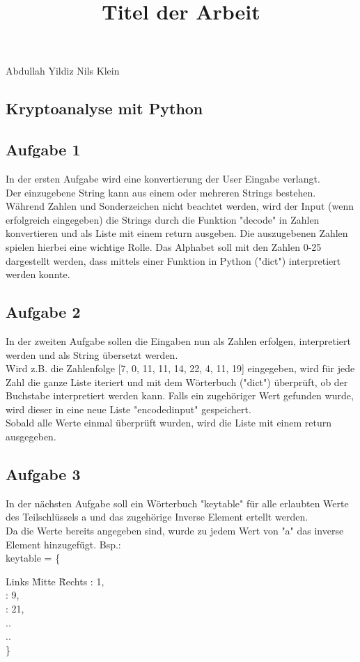 \documentclass[12pt]{article}
\title{\textbf{Titel der Arbeit}}
\begin{document}
\newpage
Abdullah Yildiz
Nils Klein


\begin{spacing}{}
\setcounter{page}{2}
\tableofcontents
\end{spacing}

\newpage
\begin{spacing}{}
\section{Kryptoanalyse mit Python}
\subsection{Aufgabe 1}
In der ersten Aufgabe wird eine konvertierung der User Eingabe verlangt.\\
Der einzugebene String kann aus einem oder mehreren Strings bestehen. Während Zahlen und Sonderzeichen nicht beachtet werden, wird der Input (wenn erfolgreich eingegeben) die Strings durch die Funktion "decode" in Zahlen konvertieren und als Liste mit einem return ausgeben. Die auszugebenen Zahlen spielen hierbei eine wichtige Rolle. Das Alphabet soll mit den Zahlen 0-25 dargestellt werden, dass mittels einer Funktion in Python ("dict") interpretiert werden konnte.

\subsection{Aufgabe 2}
In der zweiten Aufgabe sollen die Eingaben nun als Zahlen erfolgen, interpretiert werden und als String übersetzt werden.\\
Wird z.B. die Zahlenfolge [7, 0, 11, 11, 14, 22, 4, 11, 19] eingegeben, wird für jede Zahl die ganze Liste iteriert und mit dem Wörterbuch ("dict") überprüft, ob der Buchstabe interpretiert werden kann. Falls ein zugehöriger Wert gefunden wurde, wird dieser in eine neue Liste "encoded\textunderscore input" gespeichert.\\ 
Sobald alle Werte einmal überprüft wurden, wird die Liste mit einem return ausgegeben. 

\subsection{Aufgabe 3}

In der nächsten Aufgabe soll ein Wörterbuch "key\textunderscore table" für alle erlaubten Werte des Teilschlüssels a und das zugehörige Inverse Element ertellt werden.\\
Da die Werte bereits angegeben sind, wurde zu jedem Wert von "a" das inverse Element hinzugefügt. Bsp.:\\ 
key\textunderscore table = \{
\begin{tabbing}
Links \= Mitte \= Rechts \kill
{}: 1,\\
: 9,\\
: 21,\\
\> ..\\
\> ..\\
\}
\end{tabbing}


\end{spacing}
\end{document}
